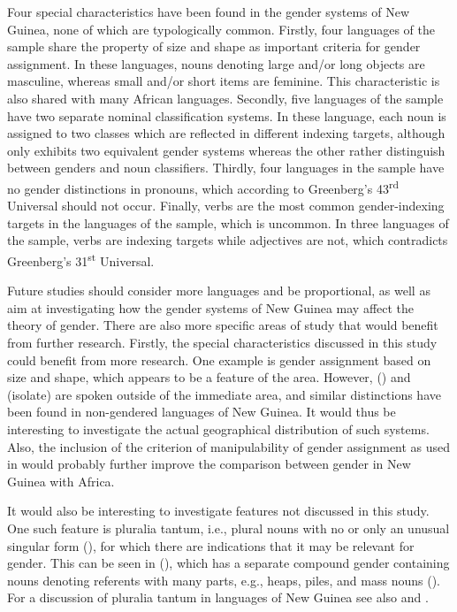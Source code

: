 \documentclass[output=collectionpaper]{langsci/langscibook}
\begin{document}
Four special characteristics have been found in the gender systems of New Guinea, none of which are typologically common. Firstly, four languages of the sample share the property of size and shape as important criteria for gender assignment. In these languages, nouns denoting large and/or long objects are masculine, whereas small and/or short items are feminine. This characteristic is also shared with many African languages. Secondly, five languages of the sample have two separate nominal classification systems. In these language, each noun is assigned to two classes which are reflected in different indexing targets, although only  exhibits two equivalent gender systems whereas the other rather distinguish between genders and noun classifiers. Thirdly, four languages in the sample have no gender distinctions in pronouns, which according to Greenberg's 43\textsuperscript{rd} Universal should not occur. Finally, verbs are the most common gender-indexing targets in the languages of the sample, which is uncommon. In three languages of the sample, verbs are indexing targets while adjectives are not, which contradicts Greenberg's 31\textsuperscript{st} Universal.


Future studies should consider more languages and be proportional, as well as aim at investigating how the gender systems of New Guinea may affect the theory of gender. There are also more specific areas of study that would benefit from further research. Firstly, the special characteristics discussed in this study could benefit from more research. One example is gender assignment based on size and shape, which appears to be a feature of the  area. However,  () and  (isolate) are spoken outside of the immediate area, and similar distinctions have been found in non-gendered languages of New Guinea. It would thus be interesting to investigate the actual geographical distribution of such systems. Also, the inclusion of the criterion of manipulability of gender assignment as used in \citet{DiGarbo2014} would probably further improve the comparison between gender in New Guinea with Africa.



It would also be interesting to investigate features not discussed in this study. One such feature is pluralia tantum, i.e., plural nouns with no or only an unusual singular form (\citealt[629]{Koptjevskaja-Tamm2001}), for which there are indications that it may be relevant for gender. This can be seen in  (), which has a separate compound gender containing nouns denoting referents with many parts, e.g., heaps, piles, and mass nouns (\citealt[68]{Arsjoe1999}). For a discussion of pluralia tantum in languages of New Guinea see also  and .
\end{document}
